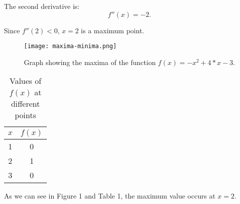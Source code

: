 \documentclass{article}
\begin{document}
The second derivative is:
\begin{equation}
f''(x) = -2.
\end{equation}

Since \(f''(2) < 0\), \(x = 2\) is a maximum point.

\begin{figure}[h]
    \centering
    \texttt{[image: maxima-minima.png]}
    \caption{Graph showing the maxima of the function \(f(x) = -x^2 + 4*x - 3\).}
\end{figure}

\begin{table}[h]
    \centering
    \begin{tabular}{|c|c|}
        \hline
        \(x\) & \(f(x)\) \\
        \hline
        1 & 0 \\
        2 & 1 \\
        3 & 0 \\
        \hline
    \end{tabular}
    \caption{Values of \(f(x)\) at different points}
\end{table}

As we can see in Figure 1 and Table 1, the maximum value occurs at \(x = 2\).
\end{document}
